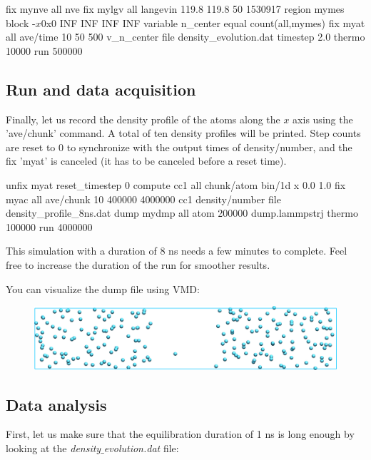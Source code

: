 \begin{lcverbatim}
fix mynve all nve
fix mylgv all langevin 119.8 119.8 50 1530917
region mymes block -${x0} ${x0} INF INF INF INF 
variable n_center equal count(all,mymes)
fix myat all ave/time 10 50 500 v_n_center file density_evolution.dat
timestep 2.0
thermo 10000
run 500000
\end{lcverbatim}

\noindent \subsection{Run and data acquisition}

Finally, let us record the density profile of the atoms
along the $x$ axis using the 'ave/chunk' command. A
total of ten density profiles will be printed. Step counts are
reset to 0 to synchronize with the output times of
density/number, and the fix 'myat' is canceled (it has to be
canceled before a reset time).

\begin{lcverbatim}
unfix myat
reset_timestep 0
compute cc1 all chunk/atom bin/1d x 0.0 1.0
fix myac all ave/chunk 10 400000 4000000 cc1 density/number file density_profile_8ns.dat
dump mydmp all atom 200000 dump.lammpstrj
thermo 100000
run 4000000
\end{lcverbatim}

\noindent This simulation with a duration of 8 ns needs a few
minutes to complete. Feel free to increase the 
duration of the run for smoother results.

You can visualize the dump file using VMD:

\begin{figure}
\includegraphics[width=\linewidth]{tutorials/level3/free-energy-calculation/system-light.png}
\end{figure}

\subsection{Data analysis}

\noindent First, let us make sure that the equilibration duration of 1
ns is long enough by looking at the \textit{density$\_$evolution.dat} file:

